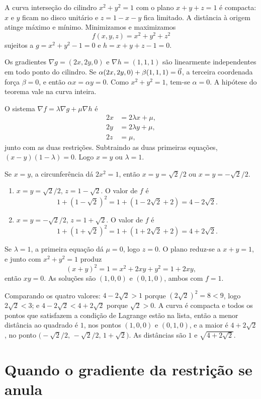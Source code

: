 \documentclass[11pt,a4paper]{article}
\begin{document}
\begin{exemplo}
A curva interseção do cilindro $x^2+y^2=1$ com o plano $x+y+z=1$ é compacta: $x$ e $y$ ficam no disco unitário e $z=1-x-y$ fica limitado. A distância à origem atinge máximo e mínimo. Minimizamos e maximizamos
\[
f(x,y,z)=x^2+y^2+z^2
\]
sujeitos a $g=x^2+y^2-1=0$ e $h=x+y+z-1=0$.

Os gradientes $\nabla g=(2x,2y,0)$ e $\nabla h=(1,1,1)$ são linearmente independentes em todo ponto do cilindro. Se $\alpha(2x,2y,0)+\beta(1,1,1)=\vec{0}$, a terceira coordenada força $\beta=0$, e então $\alpha x=\alpha y=0$. Como $x^2+y^2=1$, tem-se $\alpha=0$. A hipótese do teorema vale na curva inteira.

O sistema $\nabla f=\lambda\nabla g+\mu\nabla h$ é
\begin{align*}
2x&=2\lambda x+\mu,\\
2y&=2\lambda y+\mu,\\
2z&=\mu,
\end{align*}
junto com as duas restrições. Subtraindo as duas primeiras equações, $(x-y)(1-\lambda)=0$. Logo $x=y$ ou $\lambda=1$.

Se $x=y$, a circunferência dá $2x^2=1$, então $x=y=\sqrt{2}/2$ ou $x=y=-\sqrt{2}/2$.
\begin{enumerate}[leftmargin=1.4em]
\item $x=y=\sqrt{2}/2$, $z=1-\sqrt{2}$. O valor de $f$ é
\[
1+(1-\sqrt{2})^2=1+(1-2\sqrt{2}+2)=4-2\sqrt{2}.
\]
\item $x=y=-\sqrt{2}/2$, $z=1+\sqrt{2}$. O valor de $f$ é
\[
1+(1+\sqrt{2})^2=1+(1+2\sqrt{2}+2)=4+2\sqrt{2}.
\]
\end{enumerate}

Se $\lambda=1$, a primeira equação dá $\mu=0$, logo $z=0$. O plano reduz-se a $x+y=1$, e junto com $x^2+y^2=1$ produz
\[
(x+y)^2=1=x^2+2xy+y^2=1+2xy,
\]
então $xy=0$. As soluções são $(1,0,0)$ e $(0,1,0)$, ambos com $f=1$.

Comparando os quatro valores: $4-2\sqrt{2}>1$ porque $(2\sqrt{2})^2=8<9$, logo $2\sqrt{2}<3$; e $4-2\sqrt{2}<4+2\sqrt{2}$ porque $\sqrt{2}>0$. A curva é compacta e todos os pontos que satisfazem a condição de Lagrange estão na lista, então a menor distância ao quadrado é $1$, nos pontos $(1,0,0)$ e $(0,1,0)$, e a maior é $4+2\sqrt{2}$, no ponto $\bigl(-\sqrt{2}/2,\,-\sqrt{2}/2,\,1+\sqrt{2}\bigr)$. As distâncias são $1$ e $\sqrt{4+2\sqrt{2}}$.
\end{exemplo}

\section{Quando o gradiente da restrição se anula}
\end{document}
